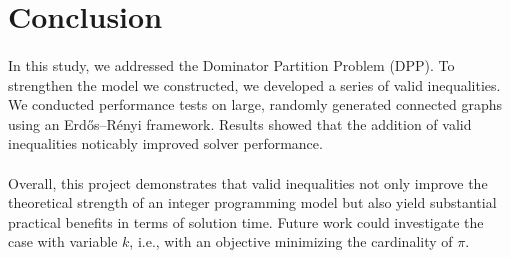 \section{Conclusion}
\label{sec:conclusion}


\paragraph{} In this study, we addressed the Dominator Partition Problem (DPP). To strengthen the model we constructed, we developed a series of valid inequalities.
We conducted performance tests on large, randomly generated connected graphs using an Erdős–Rényi framework. Results showed that the addition of valid inequalities noticably improved solver performance.

\paragraph{} Overall, this project demonstrates that valid inequalities not only improve the theoretical strength of an integer programming model but also yield substantial practical benefits in terms of solution time. Future work could investigate the case with variable $k$, i.e., with an objective minimizing the cardinality of $\pi$.
